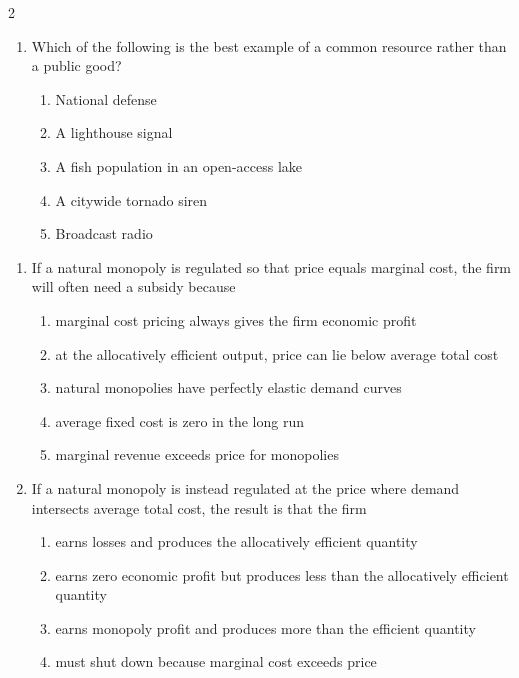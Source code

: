 \documentclass[10pt]{article}
\newenvironment{choiceslist}
  {\begin{enumerate}[label=(\Alph*), leftmargin=1.6em, itemsep=0.12em, topsep=0.18em, parsep=0pt]}
  {\end{enumerate}}
\begin{document}
\begin{multicols*}{2}
\begin{enumerate}[resume*=apq, leftmargin=*, itemsep=0.85em, topsep=0.2em, parsep=0pt]
\begin{choiceslist}
\item rivalry and nonexcludability
\item nonrivalry and excludability
\item nonrivalry and nonexcludability
\item positive externalities and rivalry
\end{choiceslist}
\item Which of the following is the best example of a common resource rather than a public good?
\begin{choiceslist}
\item National defense
\item A lighthouse signal
\item A fish population in an open-access lake
\item A citywide tornado siren
\item Broadcast radio
\end{choiceslist}
\end{enumerate}
\begin{enumerate}[resume*=apq, leftmargin=*, itemsep=0.85em, topsep=0.2em, parsep=0pt]
\item If a natural monopoly is regulated so that price equals marginal cost, the firm will often need a subsidy because
\begin{choiceslist}
\item marginal cost pricing always gives the firm economic profit
\item at the allocatively efficient output, price can lie below average total cost
\item natural monopolies have perfectly elastic demand curves
\item average fixed cost is zero in the long run
\item marginal revenue exceeds price for monopolies
\end{choiceslist}
\item If a natural monopoly is instead regulated at the price where demand intersects average total cost, the result is that the firm
\begin{choiceslist}
\item earns losses and produces the allocatively efficient quantity
\item earns zero economic profit but produces less than the allocatively efficient quantity
\item earns monopoly profit and produces more than the efficient quantity
\item must shut down because marginal cost exceeds price

\end{choiceslist}
\end{enumerate}
\end{multicols*}
\end{document}
